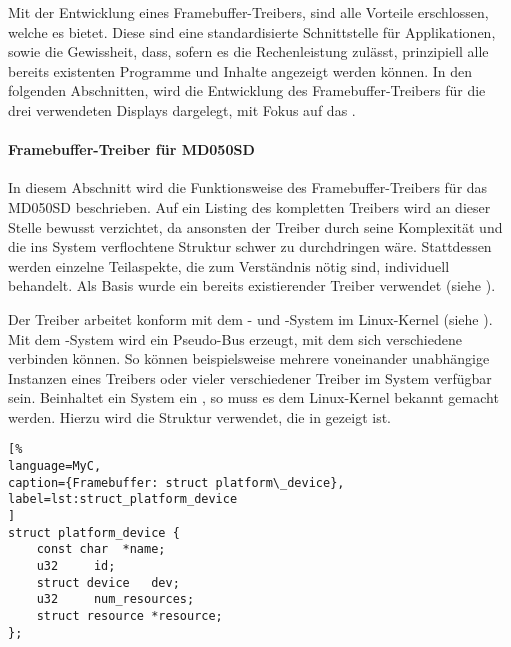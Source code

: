 Mit der Entwicklung eines Framebuffer-Treibers, sind alle Vorteile erschlossen, welche es bietet. Diese sind eine standardisierte Schnittstelle für Applikationen, sowie die Gewissheit, dass, sofern es die Rechenleistung zulässt, prinzipiell alle bereits existenten Programme und Inhalte angezeigt werden können.
In den folgenden Abschnitten, wird die Entwicklung des Framebuffer-Treibers für die drei verwendeten Displays dargelegt, mit Fokus auf das . 
\paragraph{Framebuffer-Treiber für MD050SD}
\label{cha:framebuffer}
In diesem Abschnitt wird die Funktionsweise des Framebuffer-Treibers für das MD050SD beschrieben. Auf ein Listing des kompletten Treibers wird an dieser Stelle bewusst verzichtet, da ansonsten der Treiber durch seine Komplexität und die ins System verflochtene Struktur schwer zu durchdringen wäre. Stattdessen werden einzelne Teilaspekte, die zum Verständnis nötig sind, individuell behandelt. Als Basis wurde ein bereits existierender Treiber verwendet (siehe \cite{Schlegel2013c}).

Der Treiber arbeitet konform mit dem - und -System im Linux-Kernel (siehe \cite{LinuxKernelPlatformDeviceDriver}). Mit dem -System wird ein Pseudo-Bus erzeugt, mit dem sich verschiedene  verbinden können. So können beispielsweise mehrere voneinander unabhängige Instanzen eines Treibers oder vieler verschiedener Treiber im System verfügbar sein. Beinhaltet ein System ein , so muss es dem Linux-Kernel bekannt gemacht werden. Hierzu wird die Struktur  verwendet, die in  gezeigt ist.

\begin{lstlisting}[%
language=MyC,
caption={Framebuffer: struct platform\_device},
label=lst:struct_platform_device
]
struct platform_device {
	const char	*name;
	u32		id;
	struct device	dev;
	u32		num_resources;
	struct resource	*resource;
};
\end{lstlisting}

